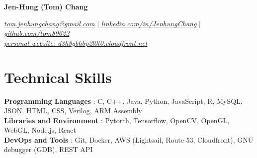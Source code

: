 \documentclass[letterpaper,11pt]{article}
\newcommand{\namespace}{
\vspace{3pt}
}
\newcommand{\sectionspace}{
\vspace{-20pt}
}
\newcommand{\subheadingtitlevspace}{
\vspace{-3pt}
}
\newcommand{\titleItem}[1]{
  \textbf{#1}
}
\begin{document}
\begin{center}
    \textbf{\Huge{\center Jen-Hung (Tom) Chang }} \\
    \namespace
    \href{mailto:tom.jenhungchang@gmail.com}{{\textit{tom.jenhungchang@gmail.com}}} $|$ 
    \href{https://linkedin.com/in/JenhungChang}{{\textit{linkedin.com/in/JenhungChang}}} $|$
    \href{https://github.com/tom89622}{{\textit{github.com/tom89622}}}
    \\\href{https://d3h8gbhbp2l0t0.cloudfront.net}{{\textit{personal website: d3h8gbhbp2l0t0.cloudfront.net}}}
    \vspace{-8pt}
\end{center}



    

\section{Technical Skills}
\subheadingtitlevspace
  \begin{itemize}[leftmargin=0.15in, label={}]
    {\item{
      \titleItem{Programming Languages}{: C, C++, Java, Python, JavaScript, R, MySQL, JSON, HTML, CSS, Verilog, ARM Assembly} \\
      \titleItem{Libraries and Environment}{: Pytorch, Tensorflow, OpenCV, OpenGL, WebGL, Node.js, React} \\
      \titleItem{DevOps and Tools}{: Git, Docker, AWS (Lightsail, Route 53, Cloudfront), GNU debugger (GDB), REST API} \\
    }}
  \end{itemize}
\sectionspace
\end{document}
